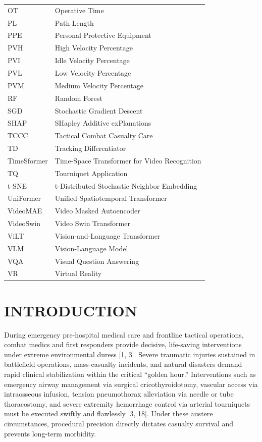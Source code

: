 \documentclass[12pt,a4paper]{report}
\begin{document}
\begin{longtable}{@{}p{2.5cm} p{11.5cm}@{}}
OT & Operative Time \\
PL & Path Length \\
PPE & Personal Protective Equipment \\
PVH & High Velocity Percentage \\
PVI & Idle Velocity Percentage \\
PVL & Low Velocity Percentage \\
PVM & Medium Velocity Percentage \\
RF & Random Forest \\
SGD & Stochastic Gradient Descent \\
SHAP & SHapley Additive exPlanations \\
TCCC & Tactical Combat Casualty Care \\
TD & Tracking Differentiator \\
TimeSformer & Time-Space Transformer for Video Recognition \\
TQ & Tourniquet Application \\
t-SNE & t-Distributed Stochastic Neighbor Embedding \\
UniFormer & Unified Spatiotemporal Transformer \\
VideoMAE & Video Masked Autoencoder \\
VideoSwin & Video Swin Transformer \\
ViLT & Vision-and-Language Transformer \\
VLM & Vision-Language Model \\
VQA & Visual Question Answering \\
VR & Virtual Reality
\end{longtable}

\newpage
\pagestyle{fancy}
\setcounter{page}{1}

\chapter{INTRODUCTION}

During emergency pre-hospital medical care and frontline tactical operations, combat medics and first responders provide decisive, life-saving interventions under extreme environmental duress [1, 3]. Severe traumatic injuries sustained in battlefield operations, mass-casualty incidents, and natural disasters demand rapid clinical stabilization within the critical ``golden hour.'' Interventions such as emergency airway management via surgical cricothyroidotomy, vascular access via intraosseous infusion, tension pneumothorax alleviation via needle or tube thoracostomy, and severe extremity hemorrhage control via arterial tourniquets must be executed swiftly and flawlessly [3, 18]. Under these austere circumstances, procedural precision directly dictates casualty survival and prevents long-term morbidity.
\end{document}
